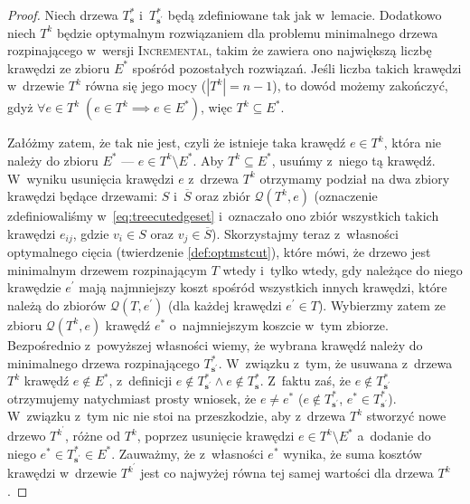 \begin{proof}
	Niech drzewa $T^{\ast}_{\textbf{s}}$ i~$T^{\ast}_{\textbf{s}^{\prime}}$ będą zdefiniowane tak jak w~lemacie.
	Dodatkowo niech $T^{k}$ będzie optymalnym rozwiązaniem dla problemu minimalnego drzewa rozpinającego w~wersji \textsc{Incremental}, takim że zawiera ono największą liczbę krawędzi ze zbioru $E^{\ast}$ spośród pozostałych rozwiązań.
	Jeśli liczba takich krawędzi w~drzewie $T^{k}$ równa się jego mocy ($\left| T^{k} \right| = n - 1$), to dowód możemy zakończyć, gdyż $\forall e \in T^{k} \; \left( e \in T^{k} \implies e \in E^{\ast} \right)$, więc $T^{k} \subseteq E^{\ast}$.
	
	Załóżmy zatem, że tak nie jest, czyli że istnieje taka krawędź $e \in T^{k}$, która nie należy do zbioru $E^{\ast}$ --- $e \in T^{k} \setminus E^{\ast}$.
	Aby $T^{k} \subseteq E^{\ast}$, usuńmy z~niego tą krawędź.
	W~wyniku usunięcia krawędzi $e$ z~drzewa $T^{k}$ otrzymamy podział na dwa zbiory krawędzi będące drzewami: $S$ i~$\overline{S}$ oraz zbiór $\mathcal{Q} \left( T^{k}, e \right)$ (oznaczenie zdefiniowaliśmy w~\ref{eq:treecutedgeset} i~oznaczało ono zbiór wszystkich takich krawędzi $e_{ij}$, gdzie $v_{i} \in S$ oraz $v_{j} \in \overline{S}$).
	Skorzystajmy teraz z~własności optymalnego cięcia (twierdzenie \ref{def:optmstcut}), które mówi, że drzewo jest minimalnym drzewem rozpinającym $T$ wtedy i~tylko wtedy, gdy należące do niego krawędzie $e^{\prime}$ mają najmniejszy koszt spośród wszystkich innych krawędzi, które należą do zbiorów $\mathcal{Q} \left( T, e^{\prime} \right)$ (dla każdej krawędzi $e^{\prime} \in T$).
	Wybierzmy zatem ze zbioru $\mathcal{Q} \left( T^{k}, e \right)$ krawędź $e^{\ast}$ o~najmniejszym koszcie w~tym zbiorze. 
	Bezpośrednio z~powyższej własności wiemy, że wybrana krawędź należy do minimalnego drzewa rozpinającego $T^{\ast}_{\textbf{s}^{\prime}}$.
	W~związku z~tym, że usuwana z~drzewa $T^{k}$ krawędź $e \notin E^{\ast}$, z~definicji $e \notin T^{\ast}_{\textbf{s}^{\prime}} \wedge e \notin T^{\ast}_{\textbf{s}}$.
	Z~faktu zaś, że $e \notin T^{\ast}_{\textbf{s}^{\prime}}$ otrzymujemy natychmiast prosty wniosek, że $e \neq e^{\ast}$ ($e \notin T^{\ast}_{\textbf{s}^{\prime}}$, $e^{\ast} \in T^{\ast}_{\textbf{s}^{\prime}}$).
	W~związku z~tym nic nie stoi na przeszkodzie, aby z~drzewa $T^{k}$ stworzyć nowe drzewo $T^{k^{\prime}}$, różne od $T^{k}$, poprzez usunięcie krawędzi $e \in T^{k} \setminus E^{\ast}$ a~dodanie do niego $e^{\ast} \in T^{\ast}_{\textbf{s}^{\prime}} \in E^{\ast}$. 
	Zauważmy, że z~własności $e^{\ast}$ wynika, że suma kosztów krawędzi w~drzewie $T^{k^{\prime}}$ jest co najwyżej równa tej samej wartości dla drzewa $T^{k}$.

\end{proof}
